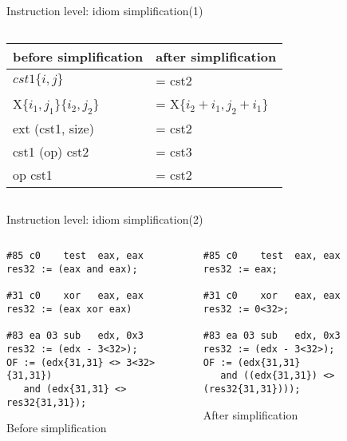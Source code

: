 \begin{frame}{Instruction level: idiom simplification(1)}
\begin{columns}[t]
     \begin{column}[T]{3.7cm}
     \begin{tiny}
     \begin{tabular}{|l|l|}
     \hline
     before simplification & after simplification \bigstrut \\
     \hline 
     \hline
       $cst1\lbrace i, j\rbrace$ & = cst2 \\
     \hline
       X$\{i_1, j_1\}\{i_2,j_2\}$ & = X$\{i_2+i_1,j_2+i_1\}$ \\
     \hline
       ext (cst1, size)  & = cst2 \\
     \hline
       cst1 (op) cst2 & = cst3 \\
     \hline
       op cst1 & = cst2 \\
     \hline
     \end{tabular}
     \end{tiny}
     \end{column}
     \end{columns}
\end{frame}


\begin{frame}[fragile]{Instruction level: idiom simplification(2)}
     \begin{columns}[t]
     \begin{column}[T]{5.5cm}
     \lstset{basicstyle=\tiny, stepnumber=10000}
     \begin{lstlisting}
#85 c0    test 	eax, eax 
res32 := (eax and eax);

#31 c0    xor 	eax, eax 
res32 := (eax xor eax)

#83 ea 03 sub 	edx, 0x3 
res32 := (edx - 3<32>);
OF := (edx{31,31} <> 3<32>{31,31}) 
   and (edx{31,31} <> res32{31,31});
     \end{lstlisting}
     \begin{center}
     Before simplification
     \end{center}
     \end{column}
     \begin{column}[T]{5.5cm}
     \lstset{basicstyle=\tiny, stepnumber=10000}
     \begin{lstlisting}
#85 c0    test 	eax, eax 
res32 := eax;

#31 c0    xor 	eax, eax 
res32 := 0<32>;

#83 ea 03 sub 	edx, 0x3 
res32 := (edx - 3<32>);
OF := (edx{31,31}
   and ((edx{31,31}) <> (res32{31,31})));
     \end{lstlisting}
     \begin{center}
     After simplification
     \end{center}
     \end{column}
     \end{columns}
\end{frame}





